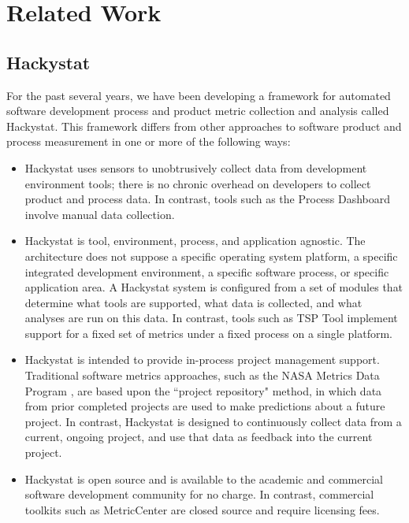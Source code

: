 \section{Related Work}

\subsection{Hackystat}

For the past several years, we have been developing a framework for
automated software development process and product metric collection and
analysis called Hackystat.  This framework differs from other approaches to
software product and process measurement in one or more of the following ways:

\begin{itemize}

\item Hackystat uses sensors to unobtrusively collect data from development
environment tools; there is no chronic overhead on developers to collect
product and process data.  In contrast, tools such as the Process Dashboard
\cite{PSPDashboard} involve manual data collection. 

\item Hackystat is tool, environment, process, and application agnostic.
The architecture does not suppose a specific operating system platform, a
specific integrated development environment, a specific software process,
or specific application area.  A Hackystat system is configured from a set
of modules that determine what tools are supported, what data is collected,
and what analyses are run on this data. In contrast, tools such as TSP Tool
\cite{TSPTool} implement support for a fixed set of metrics under a fixed
process on a single platform.

\item Hackystat is intended to provide in-process project management
support. Traditional software metrics approaches, such as 
the NASA Metrics Data Program \cite{MDPRepository},  are based upon the
``project repository" method, in which data from prior completed projects
are used to make predictions about a future
project. In contrast, Hackystat is designed to continuously collect data from a current,
ongoing project, and use that data as feedback into the current project.

\item Hackystat is open source and is available to the academic and
commercial software development community for no charge. In contrast,
commercial toolkits such as MetricCenter \cite{MetricCenter} are closed
source and require licensing fees.

\end{itemize}


